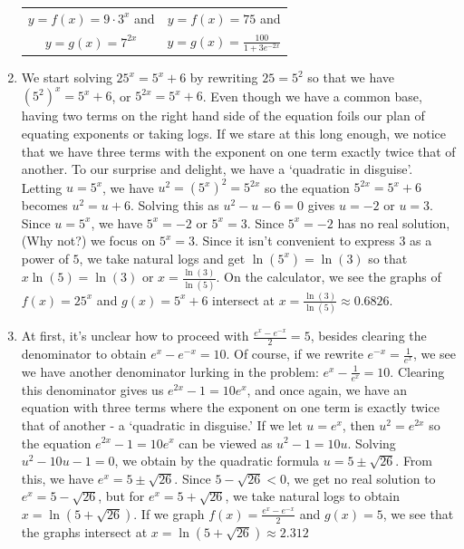 \begin{ex}
\begin{enumerate}
\begin{center}
\begin{tabular}{cc}
$y = f(x) = 9 \cdot 3^{x} $ and   & 

 \hspace{0.75in}  $y = f(x) = 75$ and \\
 
 \boldmath $y=g(x) = 7^{2x}$ & 
 \hspace{0.75in} \boldmath $y=g(x) = \frac{100}{1 + 3e^{-2x}}$  \\

\end{tabular}

\end{center}

\item  We start solving $25^{x} = 5^{x} + 6$ by rewriting $25 = 5^2$ so that we have $\left(5^2\right)^{x} = 5^{x} + 6$, or $5^{2x} = 5^{x} + 6$.  Even though we have a common base, having two terms on the right hand side of the equation foils our plan of equating exponents or taking logs.  If we stare at this long enough, we notice that we have three terms with the exponent on one term exactly twice that of another. To our surprise and delight, we have a  `quadratic in disguise'.  Letting $u = 5^{x}$,  we have $u^2 = \left(5^{x}\right)^2 = 5^{2x}$ so the equation $5^{2x} = 5^{x} + 6$ becomes $u^2 = u + 6$.  Solving this as $u^2 - u - 6=0$ gives $u = -2$ or $u = 3$.  Since $u = 5^{x}$, we have $5^{x} = -2$ or $5^{x} = 3$.  Since $5^{x} = -2$ has no real solution, (Why not?) we focus on $5^{x} = 3$.  Since it isn't convenient to express $3$ as a power of $5$, we take natural logs and get $\ln\left(5^{x}\right) = \ln(3)$ so that $x \ln(5) = \ln(3)$ or $x = \frac{\ln(3)}{\ln(5)}$.  On the calculator, we see the graphs of $f(x) = 25^{x}$ and $g(x) = 5^{x} + 6$ intersect at $x=\frac{\ln(3)}{\ln(5)} \approx 0.6826$.

\item  At first, it's unclear how to proceed with $\frac{e^{x} - e^{-x}}{2} = 5$, besides clearing the denominator to obtain $e^{x} - e^{-x} = 10$.  Of course, if we rewrite $e^{-x} = \frac{1}{e^{x}}$, we see we have another denominator lurking in the problem:  $e^{x} - \frac{1}{e^{x}} = 10$. Clearing this denominator gives us $e^{2x} - 1 = 10e^{x}$, and once again, we have an equation with three terms where the exponent on one term is exactly twice that of another - a `quadratic in disguise.'  If we let $u = e^{x}$, then $u^2 = e^{2x}$ so the equation $e^{2x} - 1 = 10e^{x}$ can be viewed as $u^2-1 = 10u$.  Solving $u^2 - 10u - 1 = 0$, we obtain by the quadratic formula $u = 5 \pm \sqrt{26}$.  From this, we have $e^{x} = 5 \pm \sqrt{26}$.  Since $5 - \sqrt{26} < 0$, we get no real solution to $e^{x} = 5 - \sqrt{26}$, but for $e^{x} = 5 + \sqrt{26}$, we take natural logs to obtain $x = \ln\left(5 + \sqrt{26}\right)$.  If we graph $f(x) = \frac{e^{x} - e^{-x}}{2}$ and $g(x) = 5$, we see that the graphs intersect at $x = \ln\left(5 + \sqrt{26}\right) \approx 2.312$


\end{enumerate}
\end{ex}
